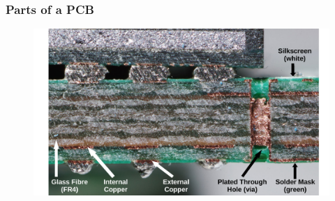 \documentclass[aspectratio=169, t]{beamer}
\begin{document}
\begin{frame}
	\frametitle{Parts of a PCB}
	\vspace{-2mm}
	\begin{figure}
		\includegraphics[width=12cm]{images/pcb-cross-section-markup.pdf}
	\end{figure}
\end{frame}
\end{document}

